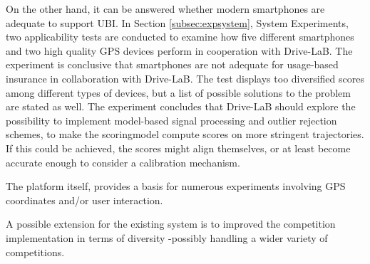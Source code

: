 On the other hand, it can be answered whether modern smartphones are adequate to support UBI. In Section \ref{subsec:expsystem}, System Experiments, two applicability tests are conducted to examine how five different smartphones and two high quality GPS devices perform in cooperation with Drive-LaB. The experiment is conclusive that smartphones are not adequate for usage-based insurance in collaboration with Drive-LaB. The test displays too diversified scores among different types of devices, but a list of possible solutions to the problem are stated as well. The experiment concludes that Drive-LaB should explore the possibility to implement model-based signal processing and outlier rejection schemes, to make the scoringmodel compute scores on more stringent trajectories. If this could be achieved, the scores might align themselves, or at least become accurate enough to consider a calibration mechanism.

The platform itself, provides a basis for numerous experiments involving GPS coordinates and/or user interaction. 

A possible extension for the existing system is to improved the competition implementation in terms of diversity -possibly handling a wider variety of competitions.


\addtolength{\textheight}{-12cm}   %
